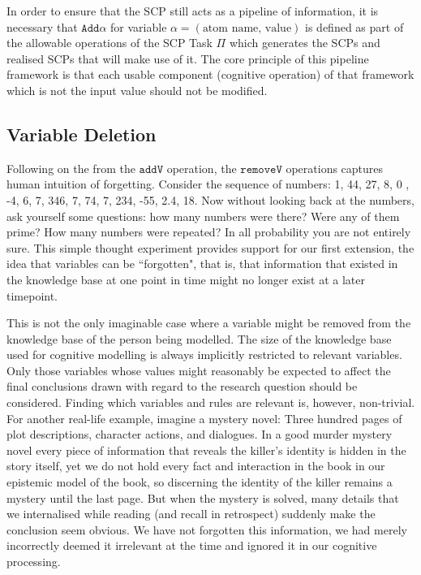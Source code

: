 In order to ensure that the SCP still acts as a pipeline of information, it is necessary that $\texttt{Add}\alpha$ for variable $\alpha=(\text{atom name, value})$ is defined as part of the allowable operations of the SCP Task $\Pi$ which generates the SCPs and realised SCPs that will make use of it. The core principle of this pipeline framework is that each usable component (cognitive operation) of that framework which is not the input value should not be modified.

\subsection{Variable Deletion} \label{ssec:deletion}
Following on the from the $\texttt{addV}$ operation, the $\texttt{removeV}$ operations captures human intuition of forgetting. Consider the sequence of numbers: 1, 44, 27, 8, 0 , -4, 6, 7, 346, 7, 74, 7, 234, -55, 2.4, 18. Now without looking back at the numbers, ask yourself some questions: how many numbers were there? Were any of them prime? How many numbers were repeated? In all probability you are not entirely sure. This simple thought experiment provides support for our first extension, the idea that variables can be ``forgotten", that is, that information that existed in the knowledge base at one point in time might no longer exist at a later timepoint. 

This is not the only imaginable case where a variable might be removed from the knowledge base of the person being modelled. The size of the knowledge base used for cognitive modelling is always implicitly restricted to relevant variables. Only those variables whose values might reasonably be expected to affect the final conclusions drawn with regard to the research question should be considered. Finding which variables and rules are relevant is, however, non-trivial. For another real-life example, imagine a mystery novel: Three hundred pages of plot descriptions, character actions, and dialogues. In a good murder mystery novel every piece of information that reveals the killer's identity is hidden in the story itself, yet we do not hold every fact and interaction in the book in our epistemic model of the book, so discerning the identity of the killer remains a mystery until the last page. But when the mystery is solved, many details that we internalised while reading (and recall in retrospect) suddenly make the conclusion seem obvious. We have not forgotten this information, we had merely incorrectly deemed it irrelevant at the time and ignored it in our cognitive processing.

